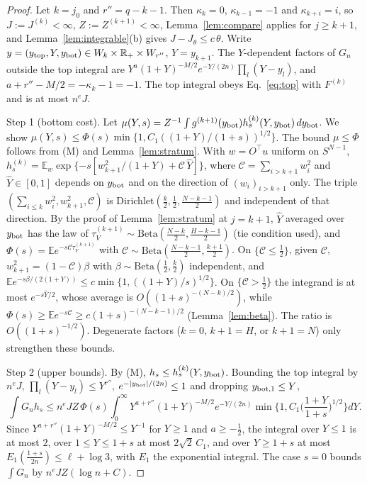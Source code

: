 \documentclass[11pt]{article}
\newcommand{\R}{\mathbb{R}}
\newcommand{\E}{\mathbb{E}}
\theoremstyle{remark}
\begin{document}
\begin{proof}
Let $k=j_0$ and $r''=q-k-1$.
Then $\kappa_k=0$, $\kappa_{k-1}=-1$ and $\kappa_{k+i}=i$, so $J:=J^{(k)}<\infty$, $Z:=Z^{(k+1)}<\infty$, Lemma~\ref{lem:compare} applies for $j\ge k+1$, and Lemma~\ref{lem:integrable}(b) gives $J-J_\theta\le c\,\theta$.
Write $y=(y_{\rm top},Y,y_{\rm bot})\in W_k\times\R_+\times W_{r''}$, $Y=y_{k+1}$.
The $Y$-dependent factors of $G_n$ outside the top integral are $Y^a(1+Y)^{-M/2}e^{-Y/(2n)}\prod_l(Y-y_l)$, and $a+r''-M/2=-\kappa_k-1=-1$.
The top integral obeys Eq.~\eqref{eq:top} with $F^{(k)}$ and is at most $n^eJ$.

Step 1 (bottom cost).
Let $\mu(Y,s)=Z^{-1}\int g^{(k+1)}(y_{\rm bot})h^{(k)}_s(Y,y_{\rm bot})\,dy_{\rm bot}$.
We show $\mu(Y,s)\le\Phi(s)\min\{1,C_1((1+Y)/(1+s))^{1/2}\}$.
The bound $\mu\le\Phi$ follows from (M) and Lemma~\ref{lem:stratum}.
With $w=O^\top u$ uniform on $S^{N-1}$, $h^{(k)}_s=\E_w\exp\{-s[w_{k+1}^2/(1+Y)+\mathcal C\,\hat Y]\}$, where $\mathcal C=\sum_{i>k+1}w_i^2$ and $\hat Y\in[0,1]$ depends on $y_{\rm bot}$ and on the direction of $(w_i)_{i>k+1}$ only.
The triple $(\sum_{i\le k}w_i^2,w_{k+1}^2,\mathcal C)$ is Dirichlet$(\tfrac k2,\tfrac12,\tfrac{N-k-1}2)$ and independent of that direction.
By the proof of Lemma~\ref{lem:stratum} at $j=k+1$, $\hat Y$ averaged over $y_{\rm bot}$ has the law of $\tau_V^{(k+1)}\sim\mathrm{Beta}(\tfrac{N-k}2,\tfrac{H-k-1}2)$ (tie condition used), and $\Phi(s)=\E e^{-s\mathcal C\tau_V^{(k+1)}}$ with $\mathcal C\sim\mathrm{Beta}(\tfrac{N-k-1}2,\tfrac{k+1}2)$.
On $\{\mathcal C\le\tfrac12\}$, given $\mathcal C$, $w_{k+1}^2=(1-\mathcal C)\beta$ with $\beta\sim\mathrm{Beta}(\tfrac12,\tfrac k2)$ independent, and $\E e^{-s\beta/(2(1+Y))}\le c\min\{1,((1+Y)/s)^{1/2}\}$.
On $\{\mathcal C>\tfrac12\}$ the integrand is at most $e^{-s\hat Y/2}$, whose average is $O((1+s)^{-(N-k)/2})$, while $\Phi(s)\ge\E e^{-s\mathcal C}\ge c(1+s)^{-(N-k-1)/2}$ (Lemma~\ref{lem:beta}).
The ratio is $O((1+s)^{-1/2})$.
Degenerate factors ($k=0$, $k+1=H$, or $k+1=N$) only strengthen these bounds.

Step 2 (upper bounds).
By (M), $h_s\le h^{(k)}_s(Y,y_{\rm bot})$.
Bounding the top integral by $n^eJ$, $\prod_l(Y-y_l)\le Y^{r''}$, $e^{-\lvert y_{\rm bot}\rvert/(2n)}\le1$ and dropping $y_{{\rm bot},1}\le Y$,
\begin{equation}
  \int G_nh_s\le n^eJZ\,\Phi(s)\int_0^\infty Y^{a+r''}(1+Y)^{-M/2}e^{-Y/(2n)}\min\Big\{1,C_1\Big(\frac{1+Y}{1+s}\Big)^{1/2}\Big\}dY .
\end{equation}
Since $Y^{a+r''}(1+Y)^{-M/2}\le Y^{-1}$ for $Y\ge1$ and $a\ge-\tfrac12$, the integral over $Y\le1$ is at most $2$, over $1\le Y\le1+s$ at most $2\sqrt2\,C_1$, and over $Y\ge1+s$ at most $E_1(\tfrac{1+s}{2n})\le\ell+\log3$, with $E_1$ the exponential integral.
The case $s=0$ bounds $\int G_n$ by $n^eJZ(\log n+C)$.


\end{proof}
\end{document}
